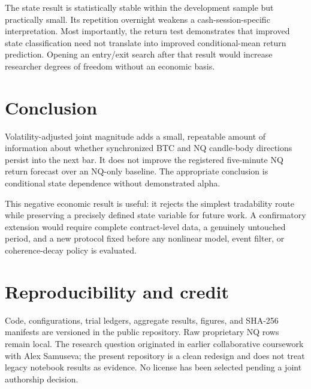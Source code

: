 \documentclass[11pt]{article}
\begin{document}
The state result is statistically stable within the development sample but practically
small. Its repetition overnight weakens a cash-session-specific interpretation. Most
importantly, the return test demonstrates that improved state classification need not
translate into improved conditional-mean return prediction. Opening an entry/exit search
after that result would increase researcher degrees of freedom without an economic basis.

\section{Conclusion}

Volatility-adjusted joint magnitude adds a small, repeatable amount of information about
whether synchronized BTC and NQ candle-body directions persist into the next bar. It does
not improve the registered five-minute NQ return forecast over an NQ-only baseline. The
appropriate conclusion is conditional state dependence without demonstrated alpha.

This negative economic result is useful: it rejects the simplest tradability route while
preserving a precisely defined state variable for future work. A confirmatory extension
would require complete contract-level data, a genuinely untouched period, and a new
protocol fixed before any nonlinear model, event filter, or coherence-decay policy is
evaluated.

\clearpage
\section*{Reproducibility and credit}
\thispagestyle{fancy}

Code, configurations, trial ledgers, aggregate results, figures, and SHA-256 manifests
are versioned in the public repository. Raw proprietary NQ rows remain local. The
research question originated in earlier collaborative coursework with Alex Samuseva;
the present repository is a clean redesign and does not treat legacy notebook results as
evidence. No license has been selected pending a joint authorship decision.
\end{document}

